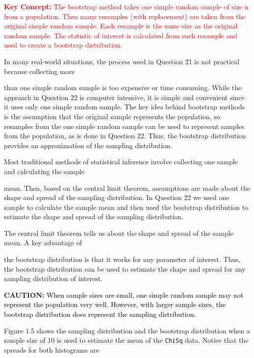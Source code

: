 \documentclass[
]{report}
\begin{document}
\Large

\textbf{\textcolor{red}{Key Concept:}}
\textcolor{red}{The bootstrap method takes one simple random sample of size n from a population. Then many resamples
(with replacement) are taken from the original simple random sample. Each resample is the same
size as the original random sample. The statistic of interest is calculated from each resample and used
to create a bootstrap distribution.}

\normalsize

In many real-world situations, the process used in Question 21 is not practical because collecting more

than one simple random sample is too expensive or time consuming. While the approach in Question 22 is
computer intensive, it is simple and convenient since it uses only one simple random sample. The key idea
behind bootstrap methods is the assumption that the original sample represents the population, so resamples
from the one simple random sample can be used to represent samples from the population, as is done in Question
22. Thus, the bootstrap distribution provides an approximation of the sampling distribution.

Most traditional methods of statistical inference involve collecting one sample and calculating the sample

mean. Then, based on the central limit theorem, assumptions are made about the shape and spread of the
sampling distribution. In Question 22 we used one sample to calculate the sample mean and then used the
bootstrap distribution to estimate the shape and spread of the sampling distribution.

The central limit theorem tells us about the shape and spread of the sample mean. A key advantage of

the bootstrap distribution is that it works for any parameter of interest. Thus, the bootstrap distribution can be
used to estimate the shape and spread for any sampling distribution of interest.

\large

\textbf{CAUTION:}
\textcolor{black}{When sample sizes are small, one simple random sample may not represent the population very well.
However, with larger sample sizes, the bootstrap distribution does represent the sampling distribution.}

\normalsize

Figure 1.5 shows the sampling distribution and the bootstrap distribution when a sample size of 10 is used to estimate the mean of the \texttt{ChiSq} data. Notice that the spreads for both histograms are
\end{document}
